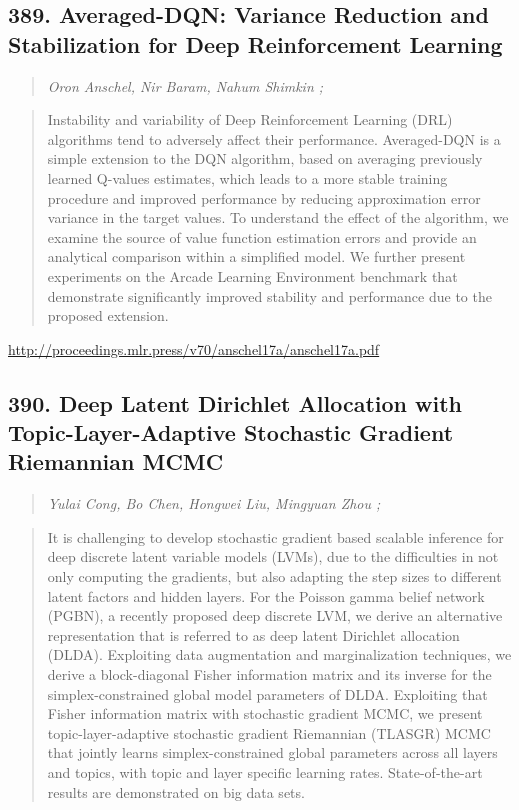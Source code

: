 \documentclass{article}
\begin{document}
\subsection{389. Averaged-DQN: Variance Reduction and Stabilization for Deep Reinforcement Learning}

\begin{quote}
\footnotesize{\textit{Oron Anschel, Nir Baram, Nahum Shimkin ;}}

\end{quote}

\begin{quote}
    Instability and variability of Deep Reinforcement Learning (DRL) algorithms tend to adversely affect their performance. Averaged-DQN is a simple extension to the DQN algorithm, based on averaging previously learned Q-values estimates, which leads to a more stable training procedure and improved performance by reducing approximation error variance in the target values. To understand the effect of the algorithm, we examine the source of value function estimation errors and provide an analytical comparison within a simplified model. We further present experiments on the Arcade Learning Environment benchmark that demonstrate significantly improved stability and performance due to the proposed extension.  
\end{quote}

\href{http://proceedings.mlr.press/v70/anschel17a/anschel17a.pdf}{http://proceedings.mlr.press/v70/anschel17a/anschel17a.pdf}

\subsection{390. Deep Latent Dirichlet Allocation with Topic-Layer-Adaptive Stochastic Gradient Riemannian MCMC}

\begin{quote}
\footnotesize{\textit{Yulai Cong, Bo Chen, Hongwei Liu, Mingyuan Zhou ;}}

\end{quote}

\begin{quote}
    It is challenging to develop stochastic gradient based scalable inference for deep discrete latent variable models (LVMs), due to the difficulties in not only computing the gradients, but also adapting the step sizes to different latent factors and hidden layers. For the Poisson gamma belief network (PGBN), a recently proposed deep discrete LVM, we derive an alternative representation that is referred to as deep latent Dirichlet allocation (DLDA). Exploiting data augmentation and marginalization techniques, we derive a block-diagonal Fisher information matrix and its inverse for the simplex-constrained global model parameters of DLDA. Exploiting that Fisher information matrix with stochastic gradient MCMC, we present topic-layer-adaptive stochastic gradient Riemannian (TLASGR) MCMC that jointly learns simplex-constrained global parameters across all layers and topics, with topic and layer specific learning rates. State-of-the-art results are demonstrated on big data sets.  
\end{quote}
\end{document}
